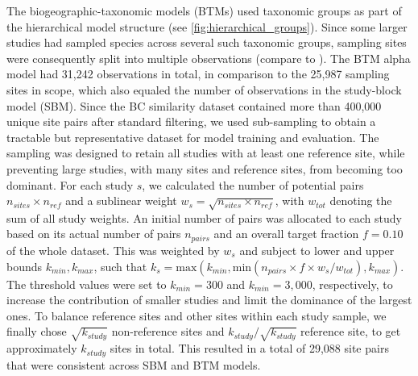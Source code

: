 
The biogeographic-taxonomic models (BTMs) used taxonomic groups as part of the hierarchical model structure (see \autoref{fig:hierarchical_groups}). Since some larger studies had sampled species across several such taxonomic groups, sampling sites were consequently split into multiple observations (compare  to ). The BTM alpha model had 31,242 observations in total, in comparison to the 25,987 sampling sites in scope, which also equaled the number of observations in the study-block model (SBM). Since the BC similarity dataset contained more than 400,000 unique site pairs after standard filtering, we used sub-sampling to obtain a tractable but representative dataset for model training and evaluation. The sampling was designed to retain all studies with at least one reference site, while preventing large studies, with many sites and reference sites, from becoming too dominant. For each study $s$, we calculated the number of potential pairs $n_{sites} \times n_{ref}$ and a sublinear weight $w_s = \sqrt{n_{sites} \times n_{ref}}$, with $w_{tot}$ denoting the sum of all study weights. An initial number of pairs was allocated to each study based on its actual number of pairs $n_{pairs}$ and an overall target fraction $f  = 0.10$ of the whole dataset. This was weighted by $w_s$ and subject to lower and upper bounds $k_{min}, k_{max}$, such that $k_s = \text{max}(k_{min}, \text{min}(n_{pairs} \times f \times w_s / w_{tot}), k_{max})$. The threshold values were set to $k_{min} = 300$ and $k_{min} = 3,000$, respectively, to increase the contribution of smaller studies and limit the dominance of the largest ones. To balance reference sites and other sites within each study sample, we finally chose $\sqrt{k_{study}}$ non-reference sites and $k_{study} / \sqrt{k_{study}}$ reference site, to get approximately $k_{study}$ sites in total. This resulted in a total of 29,088 site pairs that were consistent across SBM and BTM models.
\vspace{\baselineskip}
